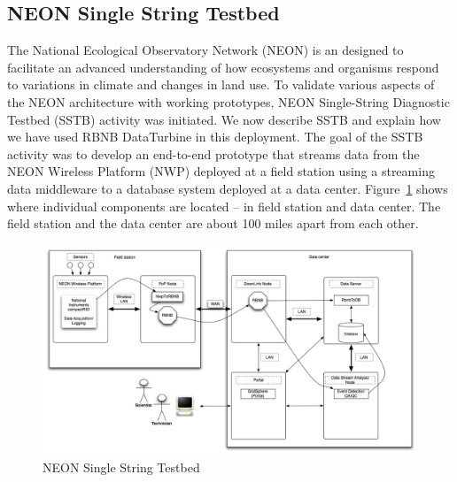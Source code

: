 \subsection{NEON Single String Testbed}
The National Ecological Observatory Network (NEON) is an designed to facilitate an advanced understanding of how ecosystems and organisms respond to variations in climate and changes 
in land use. To validate various aspects of the NEON architecture with working prototypes, 
NEON Single-String Diagnostic Testbed (SSTB) activity was initiated. We now describe SSTB and explain how we have used RBNB DataTurbine in this deployment. The goal of the SSTB activity was to develop an end-to-end prototype that streams data from the NEON Wireless Platform (NWP) deployed at a field station 
 using a streaming data middleware to a database system deployed at a data center. Figure~\ref{fig: ssarch} shows where individual components are
located -- in field station and data center. The field station and the data center are about 
100 miles apart from each other.

\begin{figure}
\includegraphics[scale=0.40]{figs/ssarch}
\caption{\label{fig: ssarch}
NEON Single String Testbed}
\end{figure}

